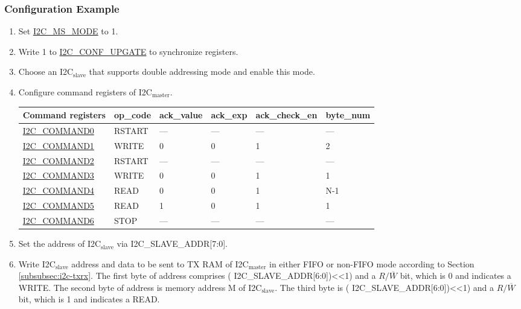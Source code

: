 \documentclass[main\_\_EN.tex]{subfiles}
\begin{document}
\subsubsection{Configuration Example}
\begin{enumerate}
\item Set \hyperref[fielddesc:I2CMSMODE]{I2C\_MS\_MODE} to 1.
\item Write 1 to \hyperref[fielddesc:I2CCONFUPGATE]{I2C\_CONF\_UPGATE} to synchronize registers.

\item Choose an I2C$_\text{slave}$ that supports double addressing mode and enable this mode.

\item Configure command registers of I2C$_\text{master}$.
\begin{longtable}{ | p{4cm} | p{2cm} | p{2cm} | p{2cm} |p{2cm} | p{2cm} |}
\hline\rowcolor{lightgray}
Command registers & op\_code & ack\_value&ack\_exp&ack\_check\_en&byte\_num  \\ \hline
\hyperref[fielddesc:I2CCOMMAND0]{I2C\_COMMAND0} & RSTART& ---&---&---&---  \\ \hline
\hyperref[fielddesc:I2CCOMMAND1]{I2C\_COMMAND1} & WRITE& 0&0&1&2  \\ \hline
\hyperref[fielddesc:I2CCOMMAND2]{I2C\_COMMAND2} & RSTART& ---&---&---&---  \\ \hline
\hyperref[fielddesc:I2CCOMMAND3]{I2C\_COMMAND3} & WRITE& 0&0&1&1  \\ \hline
\hyperref[fielddesc:I2CCOMMAND4]{I2C\_COMMAND4} & READ& 0&0&1&N-1  \\ \hline
\hyperref[fielddesc:I2CCOMMAND5]{I2C\_COMMAND5} & READ& 1&0&1&1  \\ \hline
\hyperref[fielddesc:I2CCOMMAND6]{I2C\_COMMAND6} & STOP& ---&---&---&---  \\ \hline
\end{longtable}

\item Set the address of I2C$_\text{slave}$ via I2C\_SLAVE\_ADDR[7:0].
\item Write I2C$_\text{slave}$ address and data to be sent to TX RAM of I2C$_\text{master}$ in either FIFO or non-FIFO mode according to Section \ref{subsubsec:i2c-txrx}. The first byte of address comprises ( I2C\_SLAVE\_ADDR[6:0])<<1) and a $R/\overline W$ bit, which is 0 and indicates a WRITE. The second byte of address is memory address M of I2C$_\text{slave}$. The third byte is ( I2C\_SLAVE\_ADDR[6:0])<<1) and a $R/\overline W$ bit, which is 1 and indicates a READ.


\end{enumerate}
\end{document}
